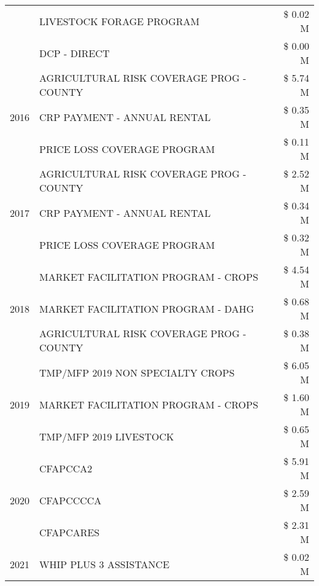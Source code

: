 \begin{tabular}{llr}
 & LIVESTOCK FORAGE PROGRAM & \$ 0.02 M \\
 & DCP - DIRECT & \$ 0.00 M \\
\cline{1-3}
\multirow[t]{3}{*}{2016} & AGRICULTURAL RISK COVERAGE PROG - COUNTY      & \$ 5.74 M \\
 & CRP PAYMENT - ANNUAL RENTAL                   & \$ 0.35 M \\
 & PRICE LOSS COVERAGE PROGRAM                   & \$ 0.11 M \\
\cline{1-3}
\multirow[t]{3}{*}{2017} & AGRICULTURAL RISK COVERAGE PROG - COUNTY & \$ 2.52 M \\
 & CRP PAYMENT - ANNUAL RENTAL & \$ 0.34 M \\
 & PRICE LOSS COVERAGE PROGRAM & \$ 0.32 M \\
\cline{1-3}
\multirow[t]{3}{*}{2018} & MARKET FACILITATION PROGRAM - CROPS & \$ 4.54 M \\
 & MARKET FACILITATION PROGRAM - DAHG & \$ 0.68 M \\
 & AGRICULTURAL RISK COVERAGE PROG - COUNTY & \$ 0.38 M \\
\cline{1-3}
\multirow[t]{3}{*}{2019} & TMP/MFP 2019 NON SPECIALTY CROPS & \$ 6.05 M \\
 & MARKET FACILITATION PROGRAM - CROPS & \$ 1.60 M \\
 & TMP/MFP 2019 LIVESTOCK & \$ 0.65 M \\
\cline{1-3}
\multirow[t]{3}{*}{2020} & CFAPCCA2 & \$ 5.91 M \\
 & CFAPCCCCA & \$ 2.59 M \\
 & CFAPCARES & \$ 2.31 M \\
\cline{1-3}
2021 & WHIP PLUS 3 ASSISTANCE & \$ 0.02 M \\
\cline{1-3}
\bottomrule
\end{tabular}
